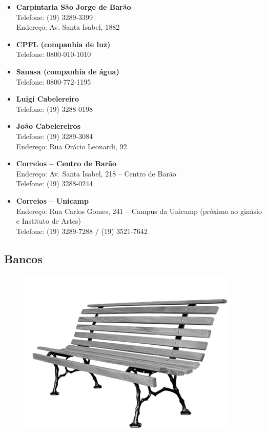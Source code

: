 \begin{itemize}
    \item  \textbf{Carpintaria São Jorge de Barão}
        \\Telefone: (19) 3289-3399
        \\Endereço: Av. Santa Isabel, 1882

    \item  \textbf{CPFL (companhia de luz)}
        \\Telefone: 0800-010-1010

    \item  \textbf{Sanasa (companhia de água)}
        \\Telefone: 0800-772-1195

    \item  \textbf{Luigi Cabelereiro}
        \\Telefone: (19) 3288-0198

    \item  \textbf{João Cabelereiros}
        \\Telefone: (19) 3289-3084
        \\Endereço: Rua Orácio Leonardi, 92

    \item  \textbf{Correios -- Centro de Barão}
        \\Endereço: Av. Santa Isabel, 218 -- Centro de Barão
        \\Telefone: (19) 3288-0244

    \item  \textbf{Correios -- Unicamp}
        \\Endereço: Rua Carlos Gomes, 241 -- Campus da Unicamp (próximo ao ginásio e Instituto de Artes)
        \\Telefone: (19) 3289-7288 / (19) 3521-7642
\end{itemize}

\subsection{Bancos}

\begin{figure}[h!]
    \centering
    \includegraphics[scale=2.28,keepaspectratio=true]{img/imgs/9-outras_necessidades/raizmadeira.png}
\end{figure}

